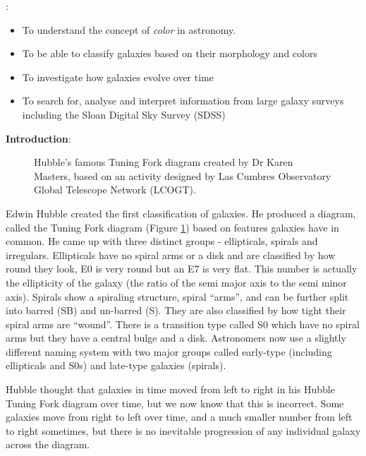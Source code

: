 
:
\begin{itemize}
\item To understand the concept of \emph{color} in astronomy.
\item  To be able to classify galaxies based on their morphology and colors
\item  To investigate how galaxies evolve over time
\item  To search for, analyse and interpret information from large galaxy surveys including the Sloan Digital Sky Survey (SDSS)
\end{itemize}

\noindent
{\bf  Introduction}:

\begin{figure}[ht]
        \begin{center}{}
        \caption{Hubble’s famous Tuning Fork diagram created by Dr Karen Masters, based on an activity designed by Las Cumbres Observatory Global Telescope Network (LCOGT).}\label{hubblefork}
        \end{center}
                \end{figure}

\noindent

Edwin Hubble created the first classification of galaxies. He produced
a diagram, called the Tuning Fork diagram (Figure \ref{hubblefork})
based on features galaxies have in common. He came up with three
distinct groups - ellipticals, spirals and irregulars. Ellipticals
have no spiral arms or a disk and are classified by how round they
look, E0 is very round but an E7 is very flat. This number is actually
the ellipticity of the galaxy (the ratio of the semi major axis to the
semi minor axis). Spirals show a spiraling structure, spiral ``arms'',
and can be further split into barred (SB) and un-barred (S). They are
also classified by how tight their spiral arms are ``wound''. There is
a transition type called S0 which have no spiral arms but they have a
central bulge and a disk. Astronomers now use a slightly different
naming system with two major groups called early-type (including
ellipticals and S0s) and late-type galaxies (spirals).

Hubble thought that galaxies in time moved from left to right in his
Hubble Tuning Fork diagram over time, but we now know that this is
incorrect. Some galaxies move from right to left over time, and a much
smaller number from left to right sometimes, but there is no
inevitable progression of any individual galaxy across the diagram.

